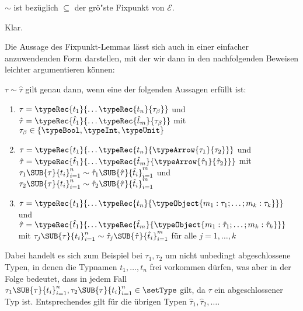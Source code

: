 \begin{korollar}
  $\sim$ ist bez\"uglich $\subseteq$ der gr\"o"ste Fixpunkt von $\mathcal{E}$.
\end{korollar}

\begin{beweis}
  Klar.
\end{beweis}

Die Aussage des Fixpunkt-Lemmas l\"asst sich auch in einer einfacher anzuwendenden Form darstellen, mit
der wir dann in den nachfolgenden Beweisen leichter argumentieren k\"onnen:

\begin{lemma} \label{lemma:Lort:Aequivalenz_Lemma}
  $\tau \sim \hat{\tau}$ gilt genau dann, wenn eine der folgenden Aussagen erf\"ullt ist:
  \begin{enumerate}
    \item $\tau = \typeRec{t_1}{\ldots\typeRec{t_n}{\tau_\beta}}$ und
          $\hat{\tau} = \typeRec{\hat{t}_1}{\ldots\typeRec{\hat{t}_m}{\tau_\beta}}$ mit $\tau_\beta\in\{\typeBool,\typeInt,\typeUnit\}$

    \item $\tau = \typeRec{t_1}{\ldots\typeRec{t_n}{\typeArrow{\tau_1}{\tau_2}}}$
          und $\hat{\tau} = \typeRec{\hat{t}_1}{\ldots\typeRec{\hat{t}_m}{\typeArrow{\hat{\tau}_1}{\hat{\tau}_2}}}$
          mit $\tau_1{\SUB{\tau}{t_i}}_{i=1}^{n} \sim \hat{\tau}_1{\SUB{\hat{\tau}}{\hat{t}_i}}_{i=1}^{m}$
          und $\tau_2{\SUB{\tau}{t_i}}_{i=1}^{n} \sim \hat{\tau}_2{\SUB{\hat{\tau}}{\hat{t}_i}}_{i=1}^{m}$

    \item $\tau = \typeRec{t_1}{\ldots\typeRec{t_n}{\typeObject{m_1:\tau_1;\ldots;m_k:\tau_k}}}$
          und $\hat{\tau} = \typeRec{\hat{t}_1}{\ldots\typeRec{\hat{t}_m}{\typeObject{m_1:\hat{\tau}_1;\ldots;m_k:\hat{\tau}_k}}}$
          mit $\tau_j{\SUB{\tau}{t_i}}_{i=1}^{n} \sim \hat{\tau}_j{\SUB{\hat{\tau}}{\hat{t}_i}}_{i=1}^{m}$ f\"ur alle $j=1,\ldots,k$
  \end{enumerate}
\end{lemma}

Dabei handelt es sich zum Beispiel bei $\tau_1,\tau_2$ um nicht unbedingt abgeschlossene Typen, in denen
die Typnamen $t_1,\ldots,t_n$ frei vorkommen d\"urfen, was aber in der Folge bedeutet, dass in jedem
Fall $\tau_1{\SUB{\tau}{t_i}}_{i=1}^{n},\tau_2{\SUB{\tau}{t_i}}_{i=1}^{n}\in\setType$ gilt, da $\tau$
ein abgeschlossener Typ ist. Entsprechendes gilt f\"ur die \"ubrigen Typen $\hat{\tau}_1, \hat{\tau}_2,\ldots$.

